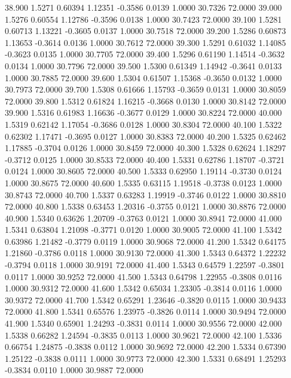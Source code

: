   38.900   1.5271   0.60394   1.12351  -0.3586   0.0139   1.0000  30.7326  72.0000
  39.000   1.5276   0.60554   1.12786  -0.3596   0.0138   1.0000  30.7423  72.0000
  39.100   1.5281   0.60713   1.13221  -0.3605   0.0137   1.0000  30.7518  72.0000
  39.200   1.5286   0.60873   1.13653  -0.3614   0.0136   1.0000  30.7612  72.0000
  39.300   1.5291   0.61032   1.14085  -0.3623   0.0135   1.0000  30.7705  72.0000
  39.400   1.5296   0.61190   1.14514  -0.3632   0.0134   1.0000  30.7796  72.0000
  39.500   1.5300   0.61349   1.14942  -0.3641   0.0133   1.0000  30.7885  72.0000
  39.600   1.5304   0.61507   1.15368  -0.3650   0.0132   1.0000  30.7973  72.0000
  39.700   1.5308   0.61666   1.15793  -0.3659   0.0131   1.0000  30.8059  72.0000
  39.800   1.5312   0.61824   1.16215  -0.3668   0.0130   1.0000  30.8142  72.0000
  39.900   1.5316   0.61983   1.16636  -0.3677   0.0129   1.0000  30.8224  72.0000
  40.000   1.5319   0.62142   1.17054  -0.3686   0.0128   1.0000  30.8304  72.0000
  40.100   1.5322   0.62302   1.17471  -0.3695   0.0127   1.0000  30.8383  72.0000
  40.200   1.5325   0.62462   1.17885  -0.3704   0.0126   1.0000  30.8459  72.0000
  40.300   1.5328   0.62624   1.18297  -0.3712   0.0125   1.0000  30.8533  72.0000
  40.400   1.5331   0.62786   1.18707  -0.3721   0.0124   1.0000  30.8605  72.0000
  40.500   1.5333   0.62950   1.19114  -0.3730   0.0124   1.0000  30.8675  72.0000
  40.600   1.5335   0.63115   1.19518  -0.3738   0.0123   1.0000  30.8743  72.0000
  40.700   1.5337   0.63283   1.19919  -0.3746   0.0122   1.0000  30.8810  72.0000
  40.800   1.5338   0.63453   1.20316  -0.3755   0.0121   1.0000  30.8876  72.0000
  40.900   1.5340   0.63626   1.20709  -0.3763   0.0121   1.0000  30.8941  72.0000
  41.000   1.5341   0.63804   1.21098  -0.3771   0.0120   1.0000  30.9005  72.0000
  41.100   1.5342   0.63986   1.21482  -0.3779   0.0119   1.0000  30.9068  72.0000
  41.200   1.5342   0.64175   1.21860  -0.3786   0.0118   1.0000  30.9130  72.0000
  41.300   1.5343   0.64372   1.22232  -0.3794   0.0118   1.0000  30.9191  72.0000
  41.400   1.5343   0.64579   1.22597  -0.3801   0.0117   1.0000  30.9252  72.0000
  41.500   1.5343   0.64798   1.22955  -0.3808   0.0116   1.0000  30.9312  72.0000
  41.600   1.5342   0.65034   1.23305  -0.3814   0.0116   1.0000  30.9372  72.0000
  41.700   1.5342   0.65291   1.23646  -0.3820   0.0115   1.0000  30.9433  72.0000
  41.800   1.5341   0.65576   1.23975  -0.3826   0.0114   1.0000  30.9494  72.0000
  41.900   1.5340   0.65901   1.24293  -0.3831   0.0114   1.0000  30.9556  72.0000
  42.000   1.5338   0.66282   1.24594  -0.3835   0.0113   1.0000  30.9621  72.0000
  42.100   1.5336   0.66754   1.24875  -0.3838   0.0112   1.0000  30.9692  72.0000
  42.200   1.5334   0.67390   1.25122  -0.3838   0.0111   1.0000  30.9773  72.0000
  42.300   1.5331   0.68491   1.25293  -0.3834   0.0110   1.0000  30.9887  72.0000
